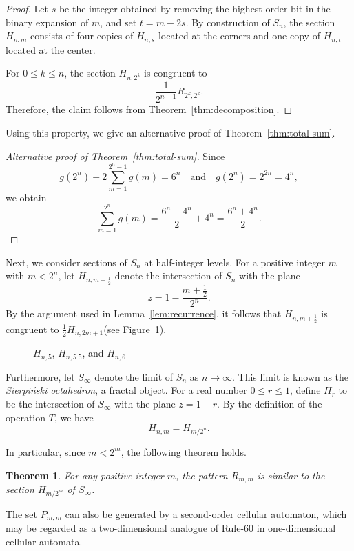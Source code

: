 \documentclass{article}
\theoremstyle{definition}
\theoremstyle{plain}
\newtheorem{theorem}[definition]{Theorem}
\theoremstyle{remark}
\begin{document}
\begin{proof}
Let $s$ be the integer obtained by removing the highest-order bit in the binary expansion of $m$, and set $t = m - 2s$.
By construction of $S_n$, the section $H_{n,m}$ consists of four copies of $H_{n,s}$ located at the corners and one copy of $H_{n,t}$ located at the center.

For $0 \le k \le n$, the section $H_{n,2^k}$ is congruent to
\[
\frac{1}{2^{n-1}} R_{2^k,2^k}.
\]
Therefore, the claim follows from Theorem~\ref{thm:decomposition}.
\end{proof}

Using this property, we give an alternative proof of Theorem~\ref{thm:total-sum}.

\begin{proof}[Alternative proof of Theorem~\ref{thm:total-sum}]
Since
\[
g(2^n) + 2 \sum_{m=1}^{2^n-1} g(m) = 6^n
\quad \text{and} \quad
g(2^n) = 2^{2n} = 4^n,
\]
we obtain
\[
\sum_{m=1}^{2^n} g(m)
= \frac{6^n - 4^n}{2} + 4^n
= \frac{6^n + 4^n}{2}.
\]
\end{proof}

Next, we consider sections of $S_n$ at half-integer levels.
For a positive integer $m$ with $m<2^n$, let $H_{n,m+\frac{1}{2}}$ denote the intersection of $S_n$ with the plane
\[
z = 1 - \frac{m+\frac{1}{2}}{2^n}.
\]
By the argument used in Lemma~\ref{lem:recurrence}, it follows that $H_{n,m+\frac{1}{2}}$ is congruent to
$\frac{1}{2} H_{n,2m+1}$(see Figure~\ref{fig:decomposition2}).

\begin{figure}[htbp]
\centering

\caption{$H_{n,5}$, $H_{n,5.5}$, and $H_{n,6}$}
\label{fig:decomposition2}
\end{figure}

Furthermore, let $S_\infty$ denote the limit of $S_n$ as $n \to \infty$.
This limit is known as the \emph{Sierpiński octahedron}, a fractal object.
For a real number $0 \le r \le 1$, define $H_{r}$ to be the intersection of
$S_\infty$ with the plane $z = 1 - r$.
By the definition of the operation $T$, we have
\[
H_{n,m} = H_{ m/2^n}.
\]

In particular, since $m < 2^m$, the following theorem holds.
\begin{theorem}
For any positive integer $m$, the pattern $R_{m,m}$ is similar to the section
$H_{m/2^m}$ of $S_\infty$.
\end{theorem}


The set $P_{m,m}$ can also be generated by a second-order cellular automaton, which may be regarded as a two-dimensional analogue of Rule-60 in one-dimensional cellular automata.
\end{document}
